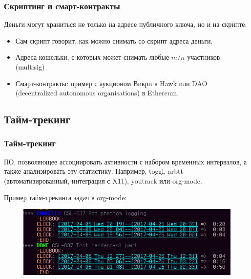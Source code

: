 \documentclass[11pt,handout,pdf,hyperref={unicode}]{beamer}
\begin{document}
%

\begin{frame}
  \frametitle{Скриптинг и смарт-контракты}

  Деньги могут храниться не только на адресе публичного ключа, но и на скрипте.
  \begin{itemize}
  \item Сам скрипт говорит, как можно снимать со скрипт адреса деньги.
  \item Адреса-кошельки, с которых может снимать любые $m/n$
    участников (multisig)
  \item Смарт-контракты: пример с аукционом Викри в Hawk
    \parencite{kosba2016hawk} или DAO (decentralized autonomous
    organisations) в Ethereum.
  \end{itemize}
\end{frame}

\subsection{Тайм-трекинг}

\begin{frame}
  \frametitle{Тайм-трекинг}

  ПО, позволяющее ассоциировать активности с набором временных
  интервалов, а также анализировать эту статистику. Например, toggl,
  arbtt (автоматизированный, интеграция с X11), youtrack или org-mode.

  Пример тайм-трекинга задач в org-mode:
  \begin{figure}[t]
  \includegraphics[scale=0.5]{org_mode_task}
  \centering
  \end{figure}
\end{frame}
\end{document}
